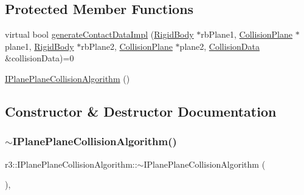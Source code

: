 \subsection*{Protected Member Functions}
\begin{DoxyCompactItemize}
\item 
virtual bool \mbox{\hyperlink{classr3_1_1_i_plane_plane_collision_algorithm_a708dec70f58b4476976dfea9921d1524}{generate\+Contact\+Data\+Impl}} (\mbox{\hyperlink{classr3_1_1_rigid_body}{Rigid\+Body}} $\ast$rb\+Plane1, \mbox{\hyperlink{classr3_1_1_collision_plane}{Collision\+Plane}} $\ast$plane1, \mbox{\hyperlink{classr3_1_1_rigid_body}{Rigid\+Body}} $\ast$rb\+Plane2, \mbox{\hyperlink{classr3_1_1_collision_plane}{Collision\+Plane}} $\ast$plane2, \mbox{\hyperlink{classr3_1_1_collision_data}{Collision\+Data}} \&collision\+Data)=0
\item 
\mbox{\hyperlink{classr3_1_1_i_plane_plane_collision_algorithm_a90114a1d9a03de817f6a00d0a054de09}{I\+Plane\+Plane\+Collision\+Algorithm}} ()
\end{DoxyCompactItemize}


\subsection{Constructor \& Destructor Documentation}
\mbox{\label{classr3_1_1_i_plane_plane_collision_algorithm_a93e78b07d3d296f30a5ab926a3a42323}} 
\subsubsection{\texorpdfstring{$\sim$\+I\+Plane\+Plane\+Collision\+Algorithm()}{~IPlanePlaneCollisionAlgorithm()}}
{\footnotesize\ttfamily r3\+::\+I\+Plane\+Plane\+Collision\+Algorithm\+::$\sim$\+I\+Plane\+Plane\+Collision\+Algorithm (\begin{DoxyParamCaption}{ }\end{DoxyParamCaption})\hspace{0.3cm}{\ttfamily [virtual]}, {\ttfamily [default]}}

\mbox{\label{classr3_1_1_i_plane_plane_collision_algorithm_a90114a1d9a03de817f6a00d0a054de09}} 
